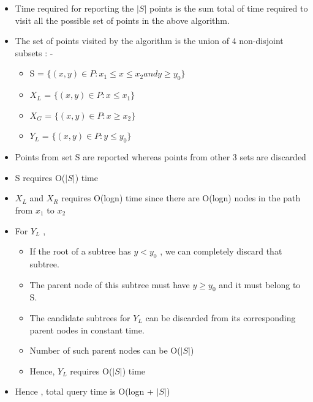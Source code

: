 \documentclass[11pt]{article}
\begin{document}
\begin{itemize}
\item Time required for reporting the $|S|$ points is the sum total of time required to visit all the possible set of points in the above algorithm. 
\item The set of points visited by the algorithm is the union of 4 non-disjoint subsets : -
\begin{itemize}
\item S = $\{ (x,y) \in P : x_1 \leq x \leq x_2 and y \geq y_0 \}$ 
\item $X_L$ = $\{ (x,y) \in P : x \leq x_1 \}$
\item $X_G$ = $\{ (x,y) \in P : x \geq x_2 \}$
\item $Y_L$ = $\{ (x,y) \in P : y \leq y_0 \}$
\end{itemize}
\item Points from set S are reported whereas points from other 3 sets are discarded
\item S requires O($|S|$) time
\item $X_L$ and $X_R$ requires O(logn) time since there are O(logn) nodes in the path from $x_1$ to $x_2$
\item For $Y_L$ ,
\begin{itemize}
\item If the root of a subtree has $y < y_0$ , we can completely discard that subtree.
\item The parent node of this subtree must have $y \geq y_0$ and it must belong to S.
\item The candidate subtrees for $Y_L$ can be discarded from its corresponding parent nodes in constant time.
\item Number of such parent nodes can be O($|S|$)
\item Hence, $Y_L$ requires O($|S|$) time 
\end{itemize}
\item Hence , total query time is O(logn + $|S|$) 
\end{itemize}
  



\pagebreak
\end{document}
